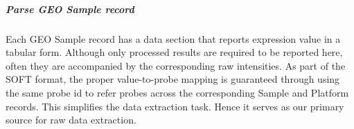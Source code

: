 




\subparagraph{\textit{Parse GEO Sample record}}
Each GEO Sample record has a data section that reports expression value in
a tabular form.
%
Although only processed results are required to be reported here, often they
are accompanied by the corresponding raw intensities.
%
As part of the SOFT format, the proper value-to-probe mapping is guaranteed
through using the same probe id to refer probes across the corresponding Sample
and Platform records.
%
This simplifies the data extraction task. 
%
Hence it serves as our primary source for raw data extraction.

